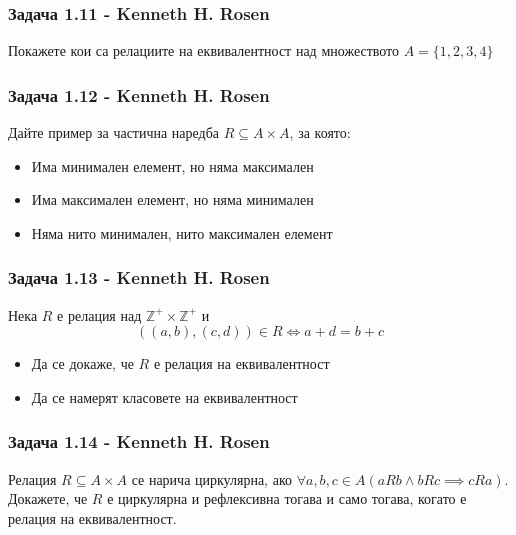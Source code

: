 \documentclass[12pt]{article}
\begin{document}
\subsubsection*{Задача 1.11 - Kenneth H. Rosen}
Покажете кои са релациите на еквивалентност над множеството $A = \{ 1, 2, 3, 4 \}$

\subsubsection*{Задача 1.12 - Kenneth H. Rosen}
Дайте пример за частична наредба $R \subseteq A \times A$, за която:
\begin{itemize}
    \item Има минимален елемент, но няма максимален
    \item Има максимален елемент, но няма минимален
    \item Няма нито минимален, нито максимален елемент
\end{itemize}

\subsubsection*{Задача 1.13 - Kenneth H. Rosen}
Нека $R$ е релация над $\mathbb{Z}^+ \times \mathbb{Z}^+$ и 
\begin{equation*}
    ((a, b), (c, d)) \in R \iff a + d = b + c
\end{equation*}
\begin{itemize}
    \item Да се докаже, че $R$ е релация на еквивалентност
    \item Да се намерят класовете на еквивалентност
\end{itemize} 

\subsubsection*{Задача 1.14 - Kenneth H. Rosen}
Релация $R \subseteq A \times A$ се нарича циркулярна, ако $\forall a, b, c \in A(aRb \land bRc \implies cRa)$. 
Докажете, че $R$ е циркулярна и рефлексивна тогава и само тогава, когато е релация на еквивалентност.
\end{document}
